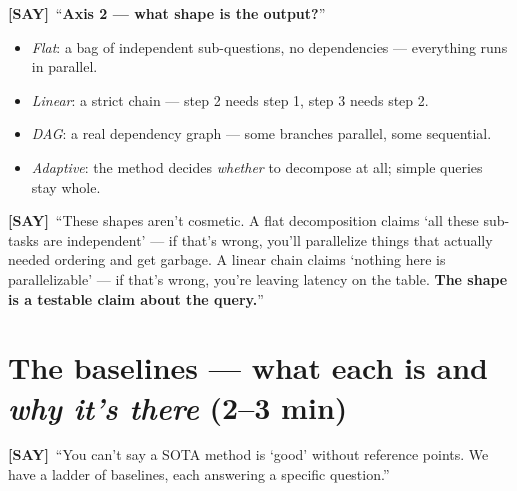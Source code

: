 \documentclass[11pt]{article}
\newcommand{\say}{\textcolor{sayc}{\textbf{[SAY]}}\ }
\begin{document}
\say ``\textbf{Axis 2 --- what shape is the output?}''
\begin{itemize}
  \item \emph{Flat}: a bag of independent sub-questions, no dependencies ---
  everything runs in parallel.
  \item \emph{Linear}: a strict chain --- step 2 needs step 1, step 3 needs step 2.
  \item \emph{DAG}: a real dependency graph --- some branches parallel, some
  sequential.
  \item \emph{Adaptive}: the method decides \emph{whether} to decompose at all;
  simple queries stay whole.
\end{itemize}

\say ``These shapes aren't cosmetic. A flat decomposition claims `all these
sub-tasks are independent' --- if that's wrong, you'll parallelize things that
actually needed ordering and get garbage. A linear chain claims `nothing here is
parallelizable' --- if that's wrong, you're leaving latency on the table.
\textbf{The shape is a testable claim about the query.}''

\section{The baselines --- what each is and \emph{why it's there} (2--3 min)}

\say ``You can't say a SOTA method is `good' without reference points. We have a
ladder of baselines, each answering a specific question.''
\end{document}
